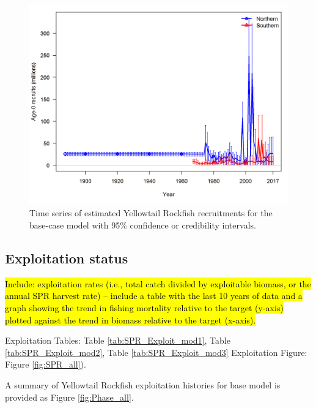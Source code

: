 \documentclass[12pt,]{article}
\begin{document}
\begin{figure}[htbp]
\centering
\includegraphics{r4ss/plots_compare/base_compare8_recruits_uncertainty.png}
\caption{Time series of estimated Yellowtail Rockfish recruitments for
the base-case model with 95\% confidence or credibility intervals.
\label{fig:Recruits_all}}
\end{figure}

\FloatBarrier

\subsection*{Exploitation status}\label{exploitation-status}

\hl{Include: exploitation rates (i.e., total catch divided by exploitable biomass, or the annual SPR harvest rate) – include a table with the last 10 years of data and a graph showing the trend in fishing mortality relative to the target (y-axis) plotted against the trend in biomass relative to the target (x-axis).}

Exploitation Tables: Table \ref{tab:SPR_Exploit_mod1}, Table
\ref{tab:SPR_Exploit_mod2}, Table \ref{tab:SPR_Exploit_mod3}
Exploitation Figure: Figure \ref{fig:SPR_all}).

A summary of Yellowtail Rockfish exploitation histories for base model
is provided as Figure \ref{fig:Phase_all}.

\FloatBarrier
\end{document}
